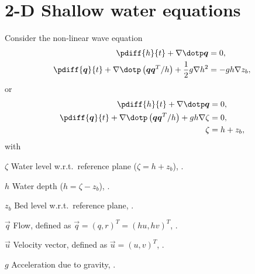 \chapter{2-D Shallow water equations}
Consider the non-linear wave equation
\begin{subequations}
    \begin{align}
        \pdiff{h}{t} + \nabla \dotp \vec{q} & = 0,
        \\
        \pdiff{\vec{q}}{t} +  \nabla \dotp \left( \vec{q}\vec{q}^T/h\right) + \half g \nabla h^2 & = -gh\nabla z_b,
    \end{align}
\end{subequations}
or
\begin{subequations}
    \begin{align}
    \pdiff{h}{t} + \nabla \dotp \vec{q} & = 0,
    \\
    \pdiff{\vec{q}}{t} +  \nabla \dotp \left( \vec{q}\vec{q}^T/h\right) + gh \nabla \zeta & = 0,
    \\
    \zeta & = h + z_b,
\end{align}
\end{subequations}
with
\begin{symbollist}
    \item[$\zeta$] Water level  w.r.t.\ reference plane ($\zeta = h + z_b$), \bunit{\metre}.
    \item[$h$] Water depth ($h = \zeta - z_b$), \bunit{\metre}.
    \item[$z_b$] Bed level  w.r.t.\ reference plane, \bunit{\metre}.
    \item[$\vec{q}$] Flow, defined as $\vec{q} = (q, r)^T = (hu, hv)^T$, \bunit{\square\metre\per\second}.
    \item[$\vec{u}$] Velocity vector, defined as $\vec{u} = (u, v)^T$, \bunit{\metre\per\second}.
    \item[$g$] Acceleration due to gravity, \bunit{\metre\per\square\second}.
\end{symbollist}
